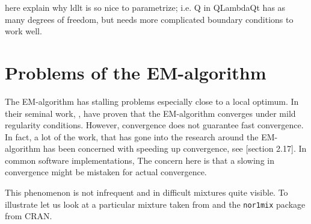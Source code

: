 here explain why ldlt is so nice to parametrize; i.e. Q in QLambdaQt has as many
degrees of freedom, but needs more complicated boundary conditions to work well.

\section{Problems of the EM-algorithm}


The EM-algorithm has stalling problems especially close to a local optimum.
In their seminal work, \cite{Dem77}, have proven that the EM-algorithm 
converges under mild regularity conditions. 
However, convergence does not guarantee fast convergence. In fact, a lot of 
the work, that has gone into the research around the EM-algorithm has been 
concerned with speeding up convergence, see \cite{McL00}[section 2.17].
In common software implementations, %
The concern here is that a slowing in convergence might be mistaken for actual
convergence.

This phenomenon is not infrequent and in difficult mixtures quite visible.
To illustrate let us look at a particular mixture taken from \cite{Mar92} and
the {\tt nor1mix} package from CRAN.




